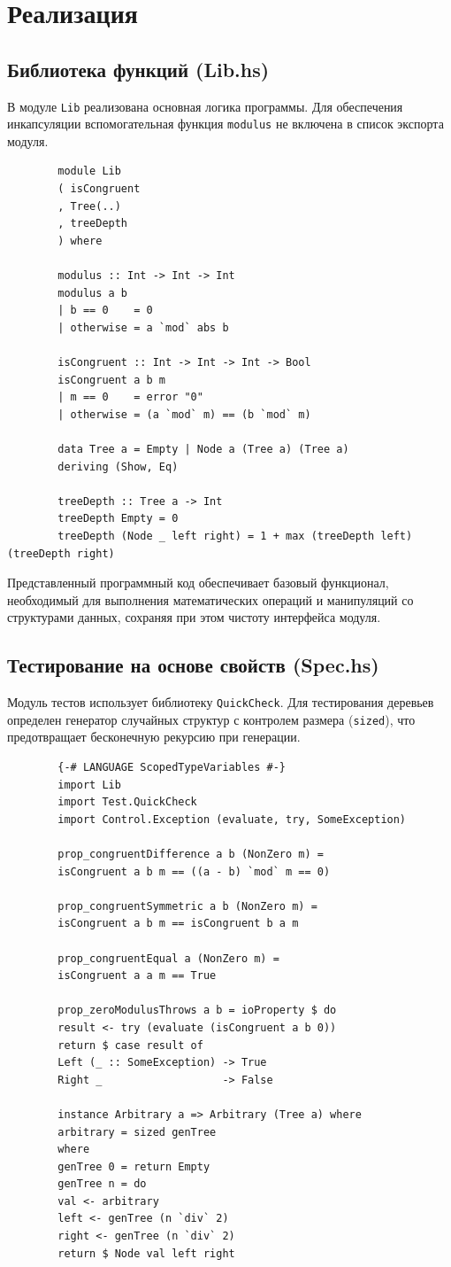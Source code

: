\documentclass[a4paper, final]{article}
\begin{document}
	\newpage
	\section{Реализация}
	
	\subsection{Библиотека функций (Lib.hs)}
	В модуле \texttt{Lib} реализована основная логика программы. Для обеспечения инкапсуляции вспомогательная функция \texttt{modulus} не включена в список экспорта модуля.
	
	\begin{lstlisting}
		module Lib
		( isCongruent
		, Tree(..)
		, treeDepth
		) where
		
		modulus :: Int -> Int -> Int
		modulus a b
		| b == 0    = 0
		| otherwise = a `mod` abs b
		
		isCongruent :: Int -> Int -> Int -> Bool
		isCongruent a b m
		| m == 0    = error "0"
		| otherwise = (a `mod` m) == (b `mod` m)
		
		data Tree a = Empty | Node a (Tree a) (Tree a)
		deriving (Show, Eq)
		
		treeDepth :: Tree a -> Int
		treeDepth Empty = 0
		treeDepth (Node _ left right) = 1 + max (treeDepth left) (treeDepth right)
	\end{lstlisting}
	
	Представленный программный код обеспечивает базовый функционал, необходимый для выполнения математических операций и манипуляций со структурами данных, сохраняя при этом чистоту интерфейса модуля.
	
	\subsection{Тестирование на основе свойств (Spec.hs)}
	Модуль тестов использует библиотеку \texttt{QuickCheck}. Для тестирования деревьев определен генератор случайных структур с контролем размера (\texttt{sized}), что предотвращает бесконечную рекурсию при генерации.
	
	\begin{lstlisting}
		{-# LANGUAGE ScopedTypeVariables #-}
		import Lib
		import Test.QuickCheck
		import Control.Exception (evaluate, try, SomeException)
		
		prop_congruentDifference a b (NonZero m) =
		isCongruent a b m == ((a - b) `mod` m == 0)
		
		prop_congruentSymmetric a b (NonZero m) =
		isCongruent a b m == isCongruent b a m
		
		prop_congruentEqual a (NonZero m) =
		isCongruent a a m == True
		
		prop_zeroModulusThrows a b = ioProperty $ do
		result <- try (evaluate (isCongruent a b 0))
		return $ case result of
		Left (_ :: SomeException) -> True
		Right _                   -> False
		
		instance Arbitrary a => Arbitrary (Tree a) where
		arbitrary = sized genTree
		where
		genTree 0 = return Empty
		genTree n = do
		val <- arbitrary
		left <- genTree (n `div` 2)
		right <- genTree (n `div` 2)
		return $ Node val left right
	\end{lstlisting}
	
\end{document}
